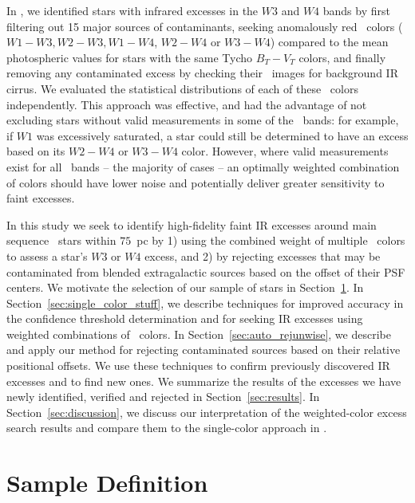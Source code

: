     In , we identified stars with infrared excesses in the $W3$ and $W4$ bands by first filtering out 15 major sources of contaminants, seeking anomalously red \WS\ colors ($W1-W3, W2-W3, W1-W4$, $W2-W4$ or $W3-W4$) compared to the mean photospheric values for stars with the same Tycho $B_T - V_T$ colors, and finally removing any contaminated excess by checking their \WS\ images for background IR cirrus. We evaluated the statistical distributions of each of these \WS\ colors independently. This approach was effective, and had the advantage of not excluding stars without valid measurements in some of the \WS\ bands: for example, if $W1$ was excessively saturated, a star could still be determined to have an excess based on its $W2-W4$ or $W3-W4$ color.  However, where valid measurements exist for all \WS\ bands -- the majority of cases -- an optimally weighted combination of colors should have lower noise and potentially deliver greater sensitivity to faint excesses. 

    In this study we seek to identify high-fidelity faint IR excesses around main sequence \hip\ stars within $75$~pc by 1) using the combined weight of multiple \WS\ colors to assess a star's $W3$ or $W4$ excess, and 2) by rejecting excesses that may be contaminated from blended extragalactic sources based on the offset of their PSF centers. We motivate the selection of our sample of stars in Section~\ref{sec:sampledef}. In Section~\ref{sec:single_color_stuff}, we describe techniques for improved accuracy in the confidence threshold determination and for seeking IR excesses using weighted combinations of \WS\ colors. In Section~\ref{sec:auto_rejunwise}, we describe and apply our method for rejecting contaminated sources based on their relative positional offsets.  We use these techniques to confirm previously discovered IR excesses and to find new ones. We summarize the results of the excesses we have newly identified, verified and rejected in Section~\ref{sec:results}. In Section~\ref{sec:discussion}, we discuss our interpretation of the weighted-color excess search results and compare them to the single-color approach in \WS.



        
\section{Sample Definition}
\label{sec:sampledef}

